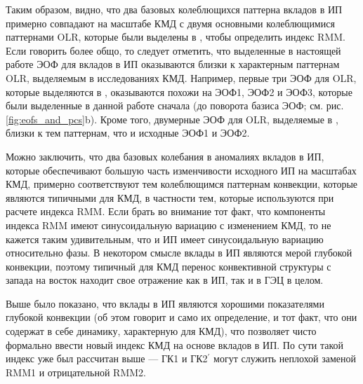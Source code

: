 Таким образом, видно, что два базовых колеблющихся паттерна вкладов в ИП примерно совпадают на масштабе КМД с двумя основными колеблющимися паттернами OLR, которые были выделены в \cite{Wheeler_Hendon_2004}, чтобы определить индекс RMM. Если говорить более общо, то следует отметить, что выделенные в настоящей работе ЭОФ для вкладов в ИП оказываются близки к характерным паттернам OLR, выделяемым в исследованиях КМД. Например, первые три ЭОФ для OLR, которые выделяются в \cite[рис. 2]{Kessler_2001}, оказываются похожи на ЭОФ1, ЭОФ2 и ЭОФ3, которые были выделенные в данной работе сначала (до поворота базиса ЭОФ; см. рис. \ref{fig:eofs_and_pcs}{b}). Кроме того, двумерные ЭОФ для OLR, выделяемые в \cite{Lo_Hendon_2000, Matthews_2000}, близки к тем паттернам, что и исходные ЭОФ1 и ЭОФ2.

Можно заключить, что два базовых колебания в аномалиях вкладов в ИП, которые обеспечивают большую часть изменчивости исходного ИП на масштабах КМД, примерно соответствуют тем колеблющимся паттернам конвекции, которые являются типичными для КМД, в частности тем, которые используются при расчете индекса RMM. Если брать во внимание тот факт, что компоненты индекса RMM имеют синусоидальную вариацию с изменением КМД, то не кажется таким удивительным, что и ИП имеет синусоидальную вариацию относительно фазы. В некотором смысле вклады в ИП являются мерой глубокой конвекции, поэтому типичный для КМД перенос конвективной структуры с запада на восток находит свое отражение как в ИП, так и в ГЭЦ в целом. 

Выше было показано, что вклады в ИП являются хорошими показателями глубокой конвекции (об этом говорит и само их определение, и тот факт, что они содержат в себе динамику, характерную для КМД), что позволяет чисто формально ввести новый индекс КМД на основе вкладов в ИП. По сути такой индекс уже был рассчитан выше --- ГК1 и ГК2$^\prime$ могут служить неплохой заменой RMM1 и отрицательной RMM2.